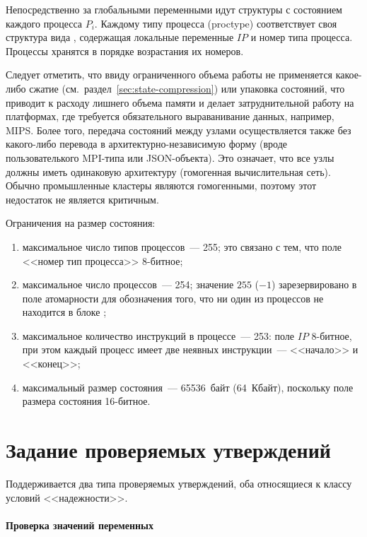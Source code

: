 Непосредственно за глобальными переменными идут структуры с состоянием каждого процесса
$P_i$. Каждому типу процесса (proctype) соответствует своя структура вида
, содержащая локальные переменные $IP$ и номер типа процесса. Процессы
хранятся в порядке возрастания их номеров.

Следует отметить, что ввиду ограниченного объема работы не применяется какое-либо сжатие
(см.~раздел~\ref{sec:state-compression}) или упаковка состояний, что приводит к расходу
лишнего объема памяти и делает затруднительной работу на платформах, где требуется
обязательного выраванивание данных, например, MIPS. Более того, передача состояний между
узлами осуществляется также без какого-либо перевода в архитектурно-независимую форму
(вроде пользователького MPI-типа или JSON-объекта). Это означает, что все узлы должны
иметь одинаковую архитектуру (гомогенная вычислительная сеть). Обычно промышленные
кластеры являются гомогенными, поэтому этот недостаток не является критичным.

Ограничения на размер состояния:
\begin{enumerate}
\item максимальное число типов процессов~--- 255; это связано с тем, что поле <<номер тип
  процесса>> 8-битное;
\item максимальное число процессов~--- 254; значение $255$ ($-1$) зарезервировано в поле
  атомарности для обозначения того, что ни один из процессов не находится в блоке
  ;
\item максимальное количество инструкций в процессе~--- 253: поле $IP$ 8-битное, при этом
  каждый процесс имеет две неявных инструкции~--- <<начало>> и <<конец>>;
\item максимальный размер состояния~--- 65536~байт (64~Кбайт), поскольку поле размера
  состояния 16-битное.
\end{enumerate}

\section{Задание проверяемых утверждений}
\label{sec:assertions}

Поддерживается два типа проверяемых утверждений, оба относящиеся к классу условий
<<надежности>>.

\paragraph{Проверка значений переменных}
\label{sec:pml-assert}

